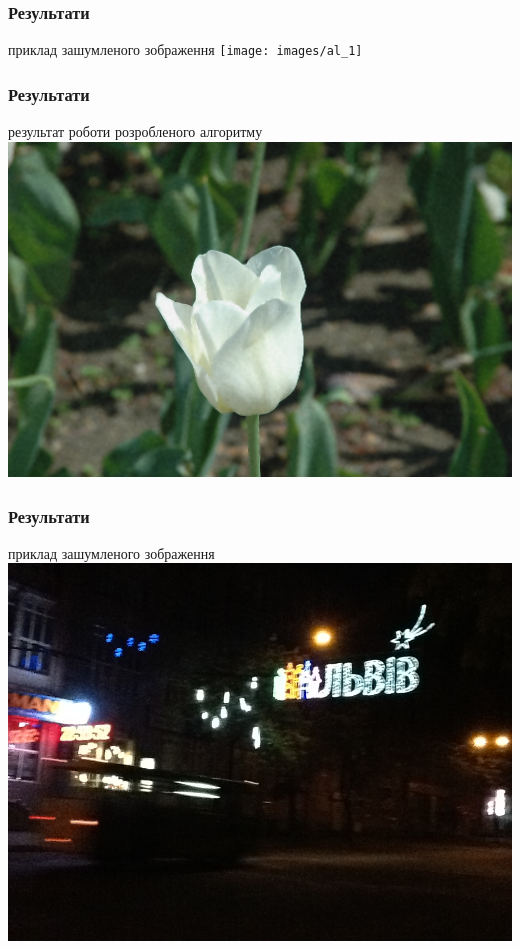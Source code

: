 \documentclass[12pt]{beamer}
\begin{document}
\begin{frame}\frametitle{ Результати}
	приклад зашумленого зображення
	\texttt{[image: images/al\_1]}
\end{frame}
\begin{frame}\frametitle{ Результати}
	результат роботи розробленого алгоритму
	\includegraphics[scale=0.28]{images/mine_1}
\end{frame}
\begin{frame}\frametitle{ Результати}
	приклад зашумленого зображення
	\includegraphics[scale=0.3]{images/lviv_orig}
\end{frame}
\end{document}
